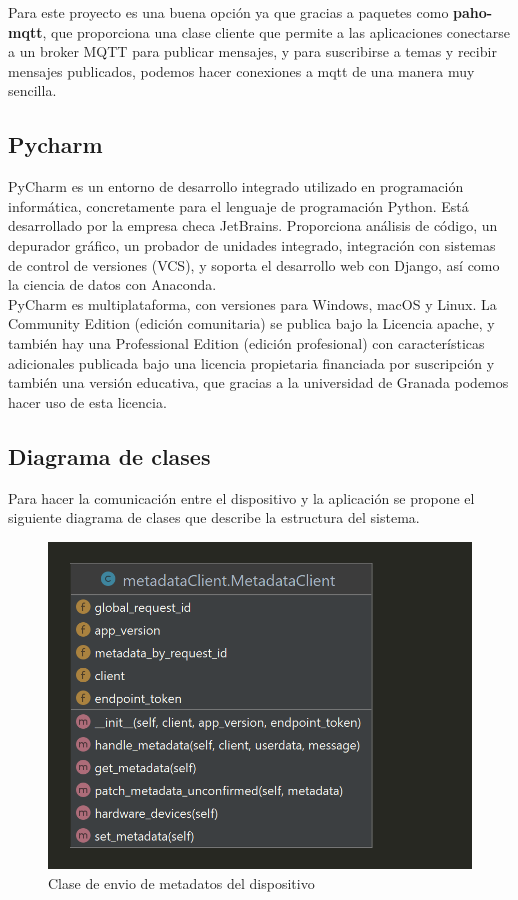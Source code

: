 {Para este proyecto es una buena opción ya que gracias a paquetes como \textbf{paho-mqtt}, que proporciona una clase cliente que permite a las aplicaciones conectarse a un broker MQTT para publicar mensajes, y para suscribirse a temas y recibir mensajes publicados, podemos hacer conexiones a mqtt de una manera muy sencilla. \cite{paho-mqtt}

\subsection{Pycharm}

PyCharm es un entorno de desarrollo integrado utilizado en programación informática, concretamente para el lenguaje de programación Python. Está desarrollado por la empresa checa JetBrains. Proporciona análisis de código, un depurador gráfico, un probador de unidades integrado, integración con sistemas de control de versiones (VCS), y soporta el desarrollo web con Django, así como la ciencia de datos con Anaconda. \\

PyCharm es multiplataforma, con versiones para Windows, macOS y Linux. La Community Edition (edición comunitaria) se publica bajo la Licencia apache, y también hay una Professional Edition (edición profesional) con características adicionales publicada bajo una licencia propietaria financiada por suscripción y también una versión educativa, que gracias a la universidad de Granada podemos hacer uso de esta licencia. \cite{pycharm}

\subsection{Diagrama de clases}

Para hacer la comunicación entre el dispositivo y la aplicación se propone el siguiente diagrama de clases que describe la estructura del sistema. 

\begin{figure}[p]
    \centering
    \includegraphics[width=\linewidth]{imagenes/metadataClient.png}
    \caption{Clase de envio de metadatos del dispositivo}
    \label{fig:figure-diseño1}
\end{figure}

}
